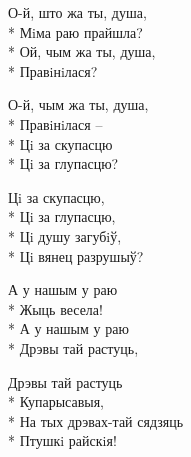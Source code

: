 \medskip

\begin{minipage}{\linewidth}
О-й, што жа ты, душа,\\*
Мiма раю прайшла?\\*
Ой, чым жа ты, душа,\\*
Правiнiлася?\\
\end{minipage}\par\medskip\nobreak

\medskip

\begin{minipage}{\linewidth}
О-й, чым жа ты, душа,\\*
Правiнiлася –\\*
Цi за скупасцю\\*
Цi за глупасцю?\\
\end{minipage}\par\medskip\nobreak

\medskip

\begin{minipage}{\linewidth}
Цi за скупасцю,\\*
Цi за глупасцю,\\*
Цi душу загубiў,\\*
Цi вянец разрушыў?\\
\end{minipage}\par\medskip\nobreak

\medskip

\begin{minipage}{\linewidth}
А у нашым у раю\\*
Жыць весела!\\*
А у нашым у раю\\*
Дрэвы тай растуць,\\
\end{minipage}\par\medskip\nobreak

\medskip

\begin{minipage}{\linewidth}
Дрэвы тай растуць\\*
Купарысавыя,\\*
На тых дрэвах-тай сядзяць\\*
Птушкi райскiя!\\
\end{minipage}\par\medskip\nobreak

\medskip


